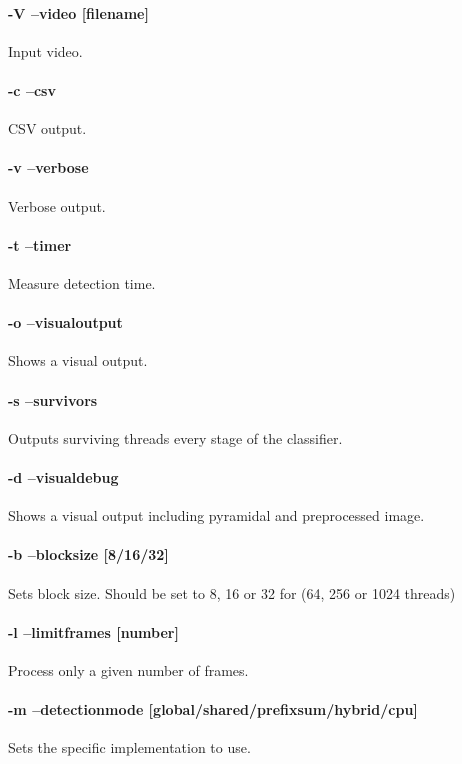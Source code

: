 \paragraph{-V --video [filename]} Input video.
\paragraph{-c --csv} CSV output.
\paragraph{-v --verbose} Verbose output.
\paragraph{-t --timer} Measure detection time.
\paragraph{-o --visualoutput} Shows a visual output.
\paragraph{-s --survivors} Outputs surviving threads every stage of the classifier.
\paragraph{-d --visualdebug} Shows a visual output including pyramidal and preprocessed image.
\paragraph{-b --blocksize [8/16/32]} Sets block size. Should be set to 8, 16 or 32 for (64, 256 or 1024 threads)
\paragraph{-l --limitframes [number]} Process only a given number of frames.
\paragraph{-m --detectionmode [global/shared/prefixsum/hybrid/cpu]} Sets the specific implementation to use.


